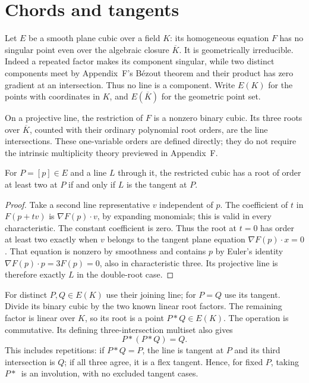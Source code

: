 \section{Chords and tangents}

Let $E$ be a smooth plane cubic over a field $K$: its homogeneous equation $F$ has no singular point even over the algebraic closure $\overline K$. It is geometrically irreducible. Indeed a repeated factor makes its component singular, while two distinct components meet by Appendix~F's B\'ezout theorem and their product has zero gradient at an intersection. Thus no line is a component. Write $E(K)$ for the points with coordinates in $K$, and $E(\overline K)$ for the geometric point set.

On a projective line, the restriction of $F$ is a nonzero binary cubic. Its three roots over $\overline K$, counted with their ordinary polynomial root orders, are the line intersections. These one-variable orders are defined directly; they do not require the intrinsic multiplicity theory previewed in Appendix~F.

\begin{lemma}\label{geometry:lem:tangentdouble}
For $P=[p]\in E$ and a line $L$ through it, the restricted cubic has a root of order at least two at $P$ if and only if $L$ is the tangent at $P$.
\end{lemma}
\begin{proof}
Take a second line representative $v$ independent of $p$. The coefficient of $t$ in $F(p+tv)$ is $\nabla F(p)\cdot v$, by expanding monomials; this is valid in every characteristic. The constant coefficient is zero. Thus the root at $t=0$ has order at least two exactly when $v$ belongs to the tangent plane equation $\nabla F(p)\cdot x=0$. That equation is nonzero by smoothness and contains $p$ by Euler's identity $\nabla F(p)\cdot p=3F(p)=0$, also in characteristic three. Its projective line is therefore exactly $L$ in the double-root case.
\end{proof}

For distinct $P,Q\in E(K)$ use their joining line; for $P=Q$ use its tangent. Divide its binary cubic by the two known linear root factors. The remaining factor is linear over $K$, so its root is a point $P*Q\in E(K)$. The operation is commutative. Its defining three-intersection multiset also gives
\[
P*(P*Q)=Q.
\]
This includes repetitions: if $P*Q=P$, the line is tangent at $P$ and its third intersection is $Q$; if all three agree, it is a flex tangent. Hence, for fixed $P$, taking $P*\,$ is an involution, with no excluded tangent cases.

